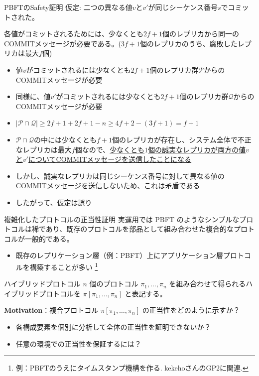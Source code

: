 \documentclass[aspectratio=169,10pt]{beamer}
\newenvironment{proofblock}[1][]
{\begin{block}{#1}\vspace{0.5em}}
{\vspace{0.5em}\end{block}}
\begin{document}
\begin{frame}{PBFTのSafety証明}
仮定: 二つの異なる値$v$と$v'$が同じシーケンス番号$s$でコミットされた。

\begin{lemma}
各値がコミットされるためには、少なくとも$2f+1$個のレプリカから同一のCOMMITメッセージが必要である。($3f+1$個のレプリカのうち、腐敗したレプリカは最大$f$個)
\end{lemma}

\begin{itemize}
\item \small 値$v$がコミットされるには少なくとも$2f+1$個のレプリカ群$\mathcal{P}$からのCOMMITメッセージが必要
\item \small 同様に、値$v'$がコミットされるには少なくとも$2f+1$個のレプリカ群$\mathcal{Q}$からのCOMMITメッセージが必要
\item \small $| \mathcal{P} \cap \mathcal{Q} | \geq 2f+1 + 2f+1 - n \geq 4f+2 - (3f+1) = f+1$
\item \small $\mathcal{P} \cap \mathcal{Q}$の中には少なくとも$f+1$個のレプリカが存在し、システム全体で不正なレプリカは最大$f$個なので、\underline{少なくとも$1$個の誠実なレプリカが両方の値$v$と$v'$についてCOMMITメッセージを送信したことになる}
\item \small しかし、誠実なレプリカは同じシーケンス番号に対して異なる値のCOMMITメッセージを送信しないため、これは矛盾である
\item \small したがって、仮定は誤り
\end{itemize}
\end{frame}



\begin{frame}{複雑化したプロトコルの正当性証明}
  実運用では PBFT のようなシンプルなプロトコルは稀であり、既存のプロトコルを部品として組み合わせた複合的なプロトコルが一般的である。

  \begin{itemize}
    \item 既存のレプリケーション層（例：PBFT）上にアプリケーション層プロトコルを構築することが多い
          \footnote{例：PBFTのうえにタイムスタンプ機構を作る. kekehoさんのGP2に関連.}
  \end{itemize}

  \begin{proofblock}[ハイブリッドプロトコル]
    $n$ 個のプロトコル $\pi_1,\dots,\pi_n$ を組み合わせて得られるハイブリッドプロトコルを $\pi[\pi_1,\dots,\pi_n]$ と表記する。
    
  \end{proofblock}

  \textbf{Motivation}：複合プロトコル $\pi[\pi_1,\dots,\pi_n]$ の正当性をどのように示すか？
  \begin{itemize}
    \item 各構成要素を個別に分析して全体の正当性を証明できないか？
    \item 任意の環境での正当性を保証するには？
  \end{itemize}
\end{frame}
\end{document}
